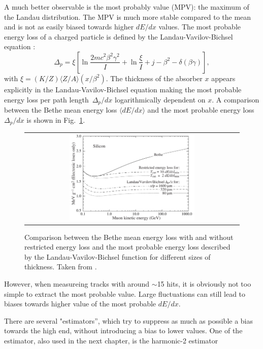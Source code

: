 A much better observable is the most probably value (MPV): the maximum of the Landau distribution.
The MPV is much more stable compared to the mean and is not as easily biased towards higher $dE/dx$ values. 
The most probable energy loss of a charged particle is defined by the Landau-Vavilov-Bichsel equation \cite{bib:Bichsel:MPV_1988}:
\begin{equation}
\Delta_p = \xi \left[ \ln \frac{2mc^2\beta^2\gamma^2}{I}  + \ln\frac{\xi}{I} + j - \beta^2 - \delta(\beta\gamma)  \right],
\label{eq:Landau_Vavilov_Bichsel}
\end{equation}
with $\xi=(K/Z)\langle Z/A \rangle (x/\beta^2)$. 
The thickness of the absorber $x$ appears explicitly in the Landau-Vavilov-Bichsel equation making the most probable energy loss per path \mbox{length $\Delta_p/dx$} logarithmically dependent on $x$.
A comparison between the Bethe mean energy loss $\langle dE/dx \rangle$ and the most probable energy loss $\Delta_p/dx$ is shown in Fig.~\ref{fig:dEdx_Bethe_Landau}.
\begin{figure}[!bt]
  \centering 
  \begin{tabular}{c}
  \includegraphics[width=0.6\textwidth]{figures/analysis/dEdx_Bethe_Landau.png}
  \end{tabular}
  \caption{Comparison between the Bethe mean energy loss with and without restricted energy loss and the most probable energy loss described by the Landau-Vavilov-Bichsel function for different sizes of thickness. 
           Taken from \cite{bib:PDG_2014}.} 
  \label{fig:dEdx_Bethe_Landau}
\end{figure}
However, when measureing tracks with around $\sim$15 hits, it is obviously not too simple to extract the most probable value. 
Large fluctuations can still lead to biases towards higher value of the most probable $dE/dx$.

There are several "estimators'', which try to suppress as much as possible a bias towards the high end, without introducing a bias to lower values.
One of the estimator, also used in the next chapter, is the harmonic-2 estimator

